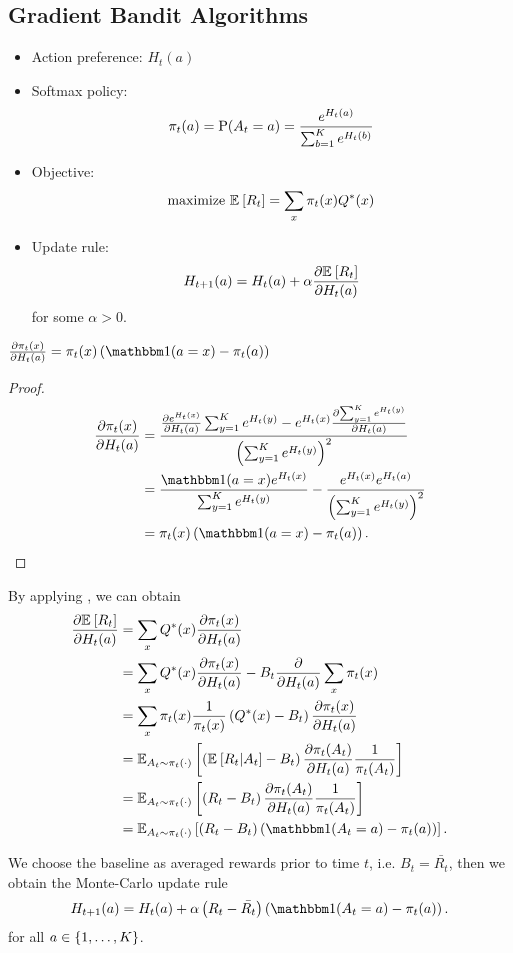 \subsection{Gradient Bandit Algorithms}
\begin{itemize}
    \item Action preference: $H_t(a)$
    \item Softmax policy: 
        \begin{equation}
            \pi_t(a) = \mathrm{P}(A_t = a) = \frac{e^{H_t(a)}}{\sum_{b = 1}^{K} e^{H_t(b)}}
        \end{equation}
    \item Objective: 
        \begin{equation}
            \underset{ {} }{\text{maximize }} {\mathbb{E}_{{}} \left[ {R_t} \right]} = \sum_x \pi_t(x) Q^*(x)
        \end{equation}
    \item Update rule: 
        \begin{equation}
            H_{t+1}(a) = H_t(a) + \alpha\frac{ \partial{\mathbb{E}_{{}} \left[ {R_t} \right]} }{ \partial{H_t(a)} }
        \end{equation}
        for some $\alpha > 0$.
\end{itemize}

\begin{lemma} \label{lemma:1}
    $\pfrac{\pi_t(x)}{H_t(a)} = \pi_t(x)\paren{\indicator(a = x) - \pi_t(a)}$
\end{lemma}
\begin{proof}
    \begin{align*}
        \pfrac{\pi_t(x)}{H_t(a)} 
            &= \frac{\pfrac{e^{H_t(x)}}{H_t(a)} \sum_{y = 1}^{K} e^{H_t(y)} - e^{H_t(x)}\pfrac{\sum_{y = 1}^{K} e^{H_t(y)}}{H_t(a)}}{\paren{\sum_{y = 1}^{K} e^{H_t(y)}}^2} \\
            &= \frac{\indicator(a = x) e^{H_t(x)}}{\sum_{y = 1}^{K} e^{H_t(y)}} - \frac{e^{H_t(x)}e^{H_t(a)}}{\paren{\sum_{y = 1}^{K} e^{H_t(y)}}^2} \\
            &= \pi_t(x)\paren{\indicator(a=x) - \pi_t(a)}.
    \end{align*}
\end{proof}

By applying , we can obtain
\begin{align*}
    \pfrac{\Exp{R_t}{}}{H_t(a)} 
        &= \sum_x Q^*(x) \pfrac{\pi_t(x)}{H_t(a)} \\
        &= \sum_x Q^*(x) \pfrac{\pi_t(x)}{H_t(a)} - B_t\pfrac{}{H_t(a)}\sum_x \pi_t(x) \\
        &= \sum_x \pi_t(x) \frac{1}{\pi_t(x)}\paren{Q^*(x) - B_t} \pfrac{\pi_t(x)}{H_t(a)} \\
        &= \Exp{\paren{\CondExp{R_t}{A_t}{} - B_t} \pfrac{\pi_t(A_t)}{H_t(a)}\frac{1}{\pi_t(A_t)}}{A_t\sim \pi_t(\cdot)} \\
        &= \Exp{\paren{R_t - B_t} \pfrac{\pi_t(A_t)}{H_t(a)}\frac{1}{\pi_t(A_t)}}{A_t\sim \pi_t(\cdot)} \\
        &= \Exp{\paren{R_t - B_t} \paren{\indicator(A_t = a) - \pi_t(a)}}{A_t\sim \pi_t(\cdot)}.
\end{align*}

We choose the baseline as averaged rewards prior to time $t$, i.e. $B_t = \bar{R_t}$, then we obtain the Monte-Carlo update rule
\begin{equation}
    H_{t+1}(a) = H_t(a) + \alpha \paren{R_t - \bar{R_t}} \paren{\indicator(A_t = a) - \pi_t(a)}.
\end{equation}
for all $a\in\left\{ {1, \dots, K} \right\}$.